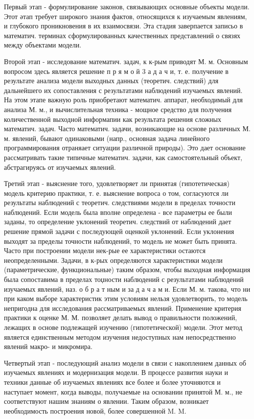 \documentclass[10pt]{article}
\begin{document}
Первый этап - формулирование законов, связывающих основные объекты модели. Этот әтап требует широкого знания фактов, относящихся к изучаемым явлениям, и глубокого проникновения в их взаимосвязи. Эта стадия заверпается записьо в математич. терминах сформулированных качественных представлений о связях между объектами модели.



Второй этап - исследование математич. задач, к к-рым приводят М. м. Основным вопросом здесь является решение п р я м о й 3 а д а ч и, т. е. получение в результате анализа модели выходных данных (теоретич. следствий) для дальнейшего их сопоставления с результатами наблюдений изучаемых явлений. На этом этапе важную роль приобретают математич. аппарат, необходимый для анализа М. м., и вычислительная техника - мощное средство для получения количественной выходной информапии как результата решения сложных математич. задач. Часто математич. задачи, возникающие на основе различных М. м. явлений, бывают одинаковыми (напр., основная задача линейного программирования отраняает ситуации различной природы). Это дает основание рассматривать такие типичные математич. задачи, как самостоятельный объект, абстрагируясь от изучаемых явлений.



Третий этап - выяснение того, удовлетворяет ли принятая (гипотетическая) модель критерию практики, т. е. выяснение вопроса о том, согласуются ли результаты наблюдений с теоретич. следствиями модели в пределах точности наблюдений. Если модель была вполне определена - все параметры ее были заданы, то определение уклонений теоретич. следствий от наблюдений дает решение прямой задачи с последующей оценкой уклонений. Если уклонения выходят за пределы точности наблюдений, то модель не может быть принята. Часто при построении модели нек-рые ее характеристики остаются неопределенными. Задачи, в к-рых определяются характеристики модели (параметрические, функциональные) таким образом, чтобы выходная информация была сопоставима в пределах тоџности наблюдений с результатами наблюдений изучаемых явлений, наз. о б р а т ным и за д а ч а м и. Если М. м. такова, что ни при каком выборе характеристик этим условиям нельзя удовлетворить, то модель непригодна для исследования рассматриваемых явлений. Применение критерия практики к оценке М. М. позволяет делать вывод о правильности положений, лежащих в основе подлежащей изучению (гипотетической) модели. Этот метод является единственным методом изучения недоступных нам непосредственно явлений макро- и микромира.



Четвертый этап - последующий анализ модели в связи с накоплением данных об изучаемых явлениях и модернизация модели. В процессе развития науки и техники данные об изучаемых явлениях все более и более уточняются и наступает момент, когда выводы, получаемые на основании принятой М. м., не соответствуют нашим знаниям о явлении. Таким образом, возникает необходимость построения новой, более совершенной M. M.
\end{document}

